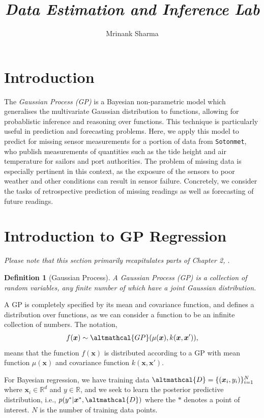 \documentclass[a4paper, twocolumn, 10pt]{article}
\title{\vspace{-3.0cm}\emph{Data Estimation and Inference Lab}}
\author{Mrinank Sharma }
\date{}
\newtheorem{definition}{Definition}[section]
\begin{document}
\maketitle
\setcounter{page}{1}

\section{Introduction}
The \emph{Gaussian Process (GP)} is a Bayesian non-parametric model which generalises the multivariate Gaussian distribution to functions, allowing for probablistic inference and reasoning over functions. This technique is particularly useful in prediction and forecasting problems. Here, we apply this model to predict for missing sensor measurements for a portion of data from  \texttt{Sotonmet}, who publish measurements of quantities such as the tide height and air temperature for sailors and port authorities. The problem of missing data is especially pertinent in this context, as the exposure of the sensors to poor weather and other conditions can result in sensor failure. Concretely, we consider the tasks of retrospective prediction of missing readings as well as forecasting of future readings. 

\section{Introduction to GP Regression}
\emph{Please note that this section primarily recapitulates parts of Chapter 2,  \cite{Rasmussen}}.

\begin{definition}[Gaussian Process]
	A Gaussian Process (GP) is a collection of random variables, any finite number of which have a joint Gaussian distribution. 
\end{definition}

A GP is completely specified by its mean and covariance function, and defines a distribution over functions, as we can consider a function to be an infinite collection of numbers. The notation,
\begin{align}
f(\bm{x}) \sim \altmathcal{GP}(\mu(\bm{x}), k(\bm{x}, \bm{x}')),
\end{align}
means that the function $f(\bm{x})$ is distributed according to a GP with mean function $\mu(\bm{x})$ and covariance function $k(\bm{x}, \bm{x}')$. 

For Bayesian regression, we have training data $\altmathcal{D} = \lbrace (\bm{x}_i , y_i) \rbrace _{i=1}^N$ where $\bm{x}_i \in \mathbb{R}^d$ and $y \in \mathbb{R}$, and we seek to learn the posterior predictive distribution, i.e., $p(y^* | \bm{x}^*, \altmathcal{D})$ where the $*$ denotes a point of interest. $N$ is the number of training data points.
\end{document}
